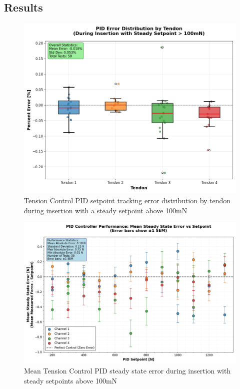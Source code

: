 \subsection{Results}

\begin{figure} [H]
    \centering
    \includegraphics[width=0.9\linewidth]{images/PID performance/PIDErrorDistByTendon.png}
    \caption{Tension Control PID setpoint tracking error distribution by tendon during insertion with a steady setpoint above 100mN}
    \label{fig:PIDErrorDistByTendon}
\end{figure}

\begin{figure} [H]
    \centering
    \includegraphics[width=0.9\linewidth]{images/PID performance/Figure_1.png}
    \caption{Mean Tension Control PID steady state error during insertion with steady setpoints above 100mN}
    \label{fig:steadtyStatePIDError}
\end{figure}

